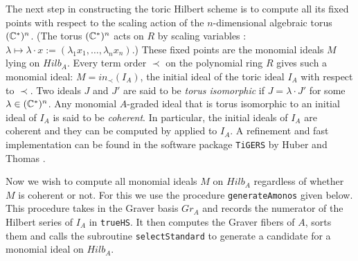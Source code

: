 The next step in constructing the toric Hilbert scheme is to compute
all its fixed points with respect to the scaling action of the
$n$-dimensional algebraic torus $(\mathbb{C}^*)^n$. (The torus $(\mathbb{C}^{\ast})^n$
acts on $R$ by scaling variables : $\lambda \mapsto \lambda \cdot x :=
(\lambda_1 x_1, \ldots, \lambda_n x_n)$.)  These fixed points are the
monomial ideals $M$ lying on $Hilb_A$.  Every term order $\prec$ on
the polynomial ring $R$ gives such a monomial ideal: $M = in_\prec(I_A
)$, the initial ideal of the toric ideal $I_A$ with respect to
$\prec$. Two ideals $J$ and $J'$ are said to be {\em torus
  isomorphic}
if $J = \lambda \cdot J'$ for some $\lambda \in (\mathbb{C}^{\ast})^n$. Any
monomial $A$-graded ideal that is torus isomorphic to an initial ideal
of $I_A$ is said to be {\em coherent}. In particular, the initial
ideals of $I_A$ are coherent and they can be computed by
\cite[Algorithm 3.6]{HS:St2} applied to $I_A$. A refinement and fast
implementation can be found in the software package {\tt TiGERS} by
Huber and Thomas \cite{HS:HT}.

Now we wish to compute all monomial ideals $M$ on $Hilb_A$ regardless
of whether $M$ is coherent or not. For this we use the procedure
{\tt generateAmonos} given below. This procedure takes in the Graver
basis $Gr_A$ and records the numerator of the Hilbert series of $I_A$
in {\tt trueHS}. It then computes the Graver fibers of $A$, sorts them
and calls the subroutine {\tt selectStandard} to generate a
candidate for a monomial ideal on $Hilb_A$.


